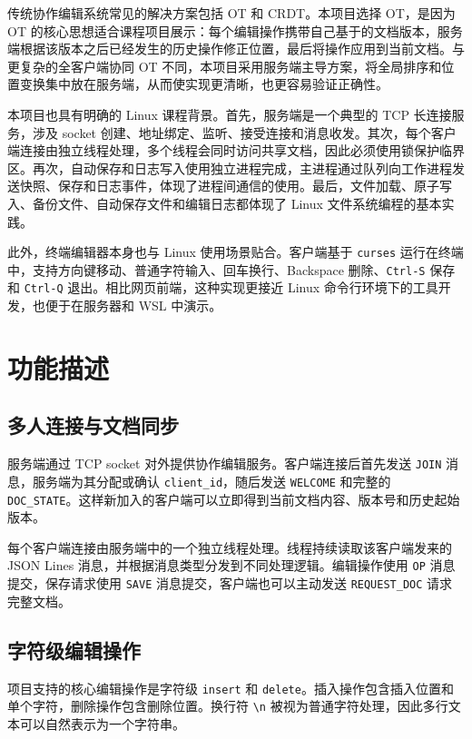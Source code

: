 传统协作编辑系统常见的解决方案包括 OT 和 CRDT。本项目选择 OT，是因为 OT 的核心思想适合课程项目展示：每个编辑操作携带自己基于的文档版本，服务端根据该版本之后已经发生的历史操作修正位置，最后将操作应用到当前文档。与更复杂的全客户端协同 OT 不同，本项目采用服务端主导方案，将全局排序和位置变换集中放在服务端，从而使实现更清晰，也更容易验证正确性。

本项目也具有明确的 Linux 课程背景。首先，服务端是一个典型的 TCP 长连接服务，涉及 socket 创建、地址绑定、监听、接受连接和消息收发。其次，每个客户端连接由独立线程处理，多个线程会同时访问共享文档，因此必须使用锁保护临界区。再次，自动保存和日志写入使用独立进程完成，主进程通过队列向工作进程发送快照、保存和日志事件，体现了进程间通信的使用。最后，文件加载、原子写入、备份文件、自动保存文件和编辑日志都体现了 Linux 文件系统编程的基本实践。

此外，终端编辑器本身也与 Linux 使用场景贴合。客户端基于 \verb|curses| 运行在终端中，支持方向键移动、普通字符输入、回车换行、Backspace 删除、\verb|Ctrl-S| 保存和 \verb|Ctrl-Q| 退出。相比网页前端，这种实现更接近 Linux 命令行环境下的工具开发，也便于在服务器和 WSL 中演示。

\section{功能描述}

\subsection{多人连接与文档同步}

服务端通过 TCP socket 对外提供协作编辑服务。客户端连接后首先发送 \verb|JOIN| 消息，服务端为其分配或确认 \verb|client_id|，随后发送 \verb|WELCOME| 和完整的 \verb|DOC_STATE|。这样新加入的客户端可以立即得到当前文档内容、版本号和历史起始版本。

每个客户端连接由服务端中的一个独立线程处理。线程持续读取该客户端发来的 JSON Lines 消息，并根据消息类型分发到不同处理逻辑。编辑操作使用 \verb|OP| 消息提交，保存请求使用 \verb|SAVE| 消息提交，客户端也可以主动发送 \verb|REQUEST_DOC| 请求完整文档。

\subsection{字符级编辑操作}

项目支持的核心编辑操作是字符级 \verb|insert| 和 \verb|delete|。插入操作包含插入位置和单个字符，删除操作包含删除位置。换行符 \verb|\n| 被视为普通字符处理，因此多行文本可以自然表示为一个字符串。

